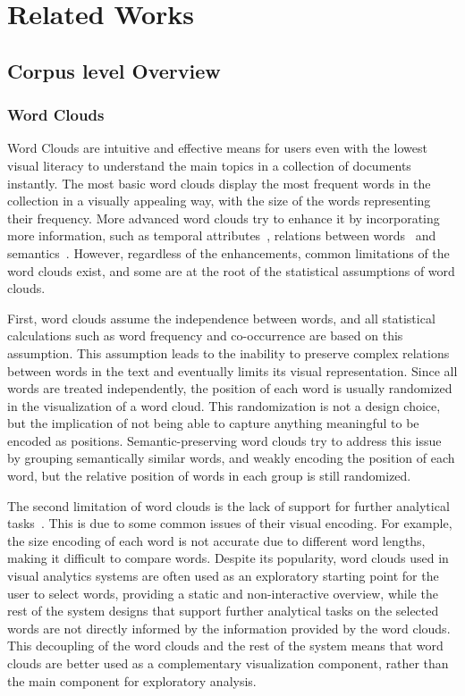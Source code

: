 \section{Related Works}
\subsection{Corpus level Overview}
\subsubsection{Word Clouds}
Word Clouds are intuitive and effective means for users even with the lowest visual literacy to understand the main topics in a collection of documents instantly.
The most basic word clouds display the most frequent words in the collection in a visually appealing way, with the size of the words representing their frequency.
More advanced word clouds try to enhance it by incorporating more information, such as temporal attributes~\cite{PyramidTags, SparkClouds}, relations between words~\cite{ParallelTagClouds, WordBridge} and semantics~\cite{SemWordCloudKLM, SemWordification, wang2020Recloud, cui2010context}.
However, regardless of the enhancements, common limitations of the word clouds exist, and some are at the root of the statistical assumptions of word clouds.

First, word clouds assume the independence between words, and all statistical calculations such as word frequency and co-occurrence are based on this assumption.
This assumption leads to the inability to preserve complex relations between words in the text and eventually limits its visual representation.
Since all words are treated independently, the position of each word is usually randomized in the visualization of a word cloud.
This randomization is not a design choice, but the implication of not being able to capture anything meaningful to be encoded as positions.
Semantic-preserving word clouds try to address this issue by grouping semantically similar words, and weakly encoding the position of each word,
but the relative position of words in each group is still randomized.

The second limitation of word clouds is the lack of support for further analytical tasks~\cite{viegas2008timelines}.
This is due to some common issues of their visual encoding.
For example, the size encoding of each word is not accurate due to different word lengths, making it difficult to compare words.
Despite its popularity, word clouds used in visual analytics systems are often used as an exploratory starting point for the user to select words,
providing a static and non-interactive overview,
while the rest of the system designs that support further analytical tasks on the selected words are not directly informed by the information provided by the word clouds.
This decoupling of the word clouds and the rest of the system means that word clouds are better used as a complementary visualization component, rather than the main component for exploratory analysis.

